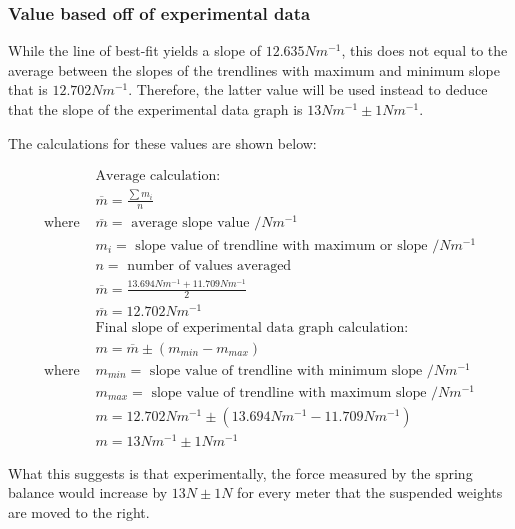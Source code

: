 \documentclass[letterpaper, 12pt]{article}
\begin{document}
\subsubsection{Value based off of experimental data}

While the line of best-fit yields a slope of $12.635\unit{Nm^{-1}}$,
this does not equal to the average between the slopes of the trendlines
with maximum and minimum slope that is $12.702\unit{Nm^{-1}}$. Therefore,
the latter value will be used instead to deduce that the slope of the
experimental data graph is $13\unit{Nm^{-1}} \pm 1\unit{Nm^{-1}}$.

The calculations for these values are shown below:

\begin{align*}
                  & \text{Average calculation:}
    \\
                  & \overline{m} = \frac{\sum m_i}{n}
    \\
    \text{where } & \overline{m} = \text{ average slope value } /\unit{Nm^{-1}}
    \\ & m_i = \text{ slope value of trendline with maximum or slope } /\unit{Nm^{-1}}
    \\ & n = \text{ number of values averaged }
    \\
                  & \overline{m} = \frac{13.694\unit{Nm^{-1}} + 11.709\unit{Nm^{-1}}}{2}
    \\
                  & \overline{m} = 12.702\unit{Nm^{-1}}
    \\
                  & \text{Final slope of experimental data graph calculation:}
    \\
                  & m = \overline{m} \pm (m_{min} - m_{max})
    \\
    \text{where } & m_{min} = \text{ slope value of trendline with minimum slope } /\unit{Nm^{-1}}
    \\ & m_{max} = \text{ slope value of trendline with maximum slope } /\unit{Nm^{-1}}
    \\
                  & m = 12.702\unit{Nm^{-1}} \pm (13.694\unit{Nm^{-1}} - 11.709\unit{Nm^{-1}})
    \\
                  & m = 13\unit{Nm^{-1}} \pm 1\unit{Nm^{-1}}
\end{align*}

What this suggests is that experimentally, the force measured by the
spring balance would increase by $13\unit{N} \pm 1\unit{N}$ for every
meter that the suspended weights are moved to the right.
\end{document}
